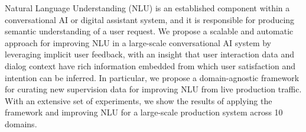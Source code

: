 Natural Language Understanding (NLU) is an established component within a conversational AI or digital assistant system, and it is responsible for producing semantic understanding of a user request. We propose a scalable and automatic approach for improving NLU in a large-scale conversational AI system by leveraging implicit user feedback, with an insight that user interaction data and dialog context have rich information embedded from which user satisfaction and intention can be inferred. In particular, we propose a domain-agnostic framework for curating new supervision data for improving NLU from live production traffic. With an extensive set of experiments, we show the results of applying the framework and improving NLU for a large-scale production system across 10 domains.
